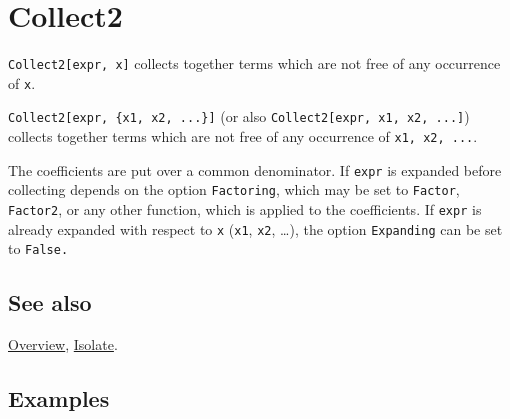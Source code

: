 \documentclass[../FeynCalcManual.tex]{subfiles}
\begin{document}
\hypertarget{collect2}{%
\section{Collect2}\label{collect2}}

\texttt{Collect2[\allowbreak{}expr,\ \allowbreak{}x]} collects together
terms which are not free of any occurrence of \texttt{x}.

\texttt{Collect2[\allowbreak{}expr,\ \allowbreak{}\{\allowbreak{}x1,\ \allowbreak{}x2,\ \allowbreak{}...\}]}
(or also
\texttt{Collect2[\allowbreak{}expr,\ \allowbreak{}x1,\ \allowbreak{}x2,\ \allowbreak{}...]})
collects together terms which are not free of any occurrence of
\texttt{x1,\ \allowbreak{}x2,\ \allowbreak{}...}.

The coefficients are put over a common denominator. If \texttt{expr} is
expanded before collecting depends on the option \texttt{Factoring},
which may be set to \texttt{Factor}, \texttt{Factor2}, or any other
function, which is applied to the coefficients. If \texttt{expr} is
already expanded with respect to \texttt{x} (\texttt{x1}, \texttt{x2},
\ldots), the option \texttt{Expanding} can be set to \texttt{False.}

\subsection{See also}

\hyperlink{toc}{Overview}, \hyperlink{isolate}{Isolate}.

\subsection{Examples}

\begin{Shaded}
\begin{Highlighting}[]
\OperatorTok{[}\ExtensionTok{=}  \SpecialCharTok{+}   \SpecialCharTok{+} \SpecialCharTok{\^{}} \OperatorTok{[}\OperatorTok{]} \SpecialCharTok{{-}}  \OperatorTok{[}\OperatorTok{]} \SpecialCharTok{+} \SpecialCharTok{/} \SpecialCharTok{{-}} \SpecialCharTok{/}\OperatorTok{,} \OperatorTok{]}
\end{Highlighting}
\end{Shaded}
\end{document}
